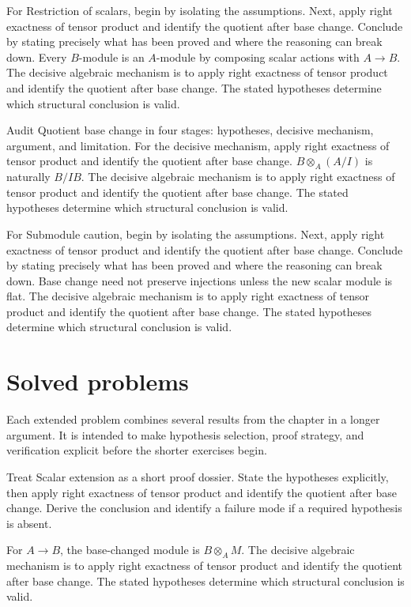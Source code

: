 \begin{example}\label{ex:v11-worked-02}
For Restriction of scalars, begin by isolating the assumptions. Next, apply right exactness of tensor product and identify the quotient after base change. Conclude by stating precisely what has been proved and where the reasoning can break down. Every $B$-module is an $A$-module by composing scalar actions with $A\to B$. The decisive algebraic mechanism is to apply right exactness of tensor product and identify the quotient after base change. The stated hypotheses determine which structural conclusion is valid.
\end{example}

\begin{example}\label{ex:v11-worked-03}
Audit Quotient base change in four stages: hypotheses, decisive mechanism, argument, and limitation. For the decisive mechanism, apply right exactness of tensor product and identify the quotient after base change. $B\otimes_A(A/I)$ is naturally $B/IB$. The decisive algebraic mechanism is to apply right exactness of tensor product and identify the quotient after base change. The stated hypotheses determine which structural conclusion is valid.
\end{example}

\begin{example}\label{ex:v11-worked-04}
For Submodule caution, begin by isolating the assumptions. Next, apply right exactness of tensor product and identify the quotient after base change. Conclude by stating precisely what has been proved and where the reasoning can break down. Base change need not preserve injections unless the new scalar module is flat. The decisive algebraic mechanism is to apply right exactness of tensor product and identify the quotient after base change. The stated hypotheses determine which structural conclusion is valid.
\end{example}

\section{Solved problems}
Each extended problem combines several results from the chapter in a longer argument. It is intended to make hypothesis selection, proof strategy, and verification explicit before the shorter exercises begin.

\begin{problem}\label{prob:v11-problem-01}
Treat Scalar extension as a short proof dossier. State the hypotheses explicitly, then apply right exactness of tensor product and identify the quotient after base change. Derive the conclusion and identify a failure mode if a required hypothesis is absent.
\end{problem}
\begin{solution}
For $A\to B$, the base-changed module is $B\otimes_A M$. The decisive algebraic mechanism is to apply right exactness of tensor product and identify the quotient after base change. The stated hypotheses determine which structural conclusion is valid.
\end{solution}


